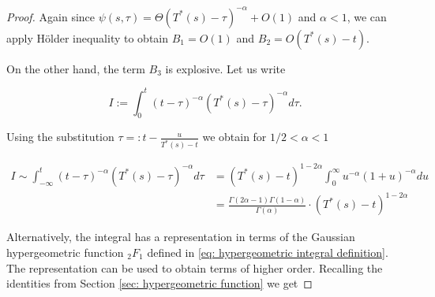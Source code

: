 \documentclass[12pt,twoside]{article}
\theoremstyle{plain}
\theoremstyle{plain}
\theoremstyle{definition}
\theoremstyle{remark}
\numberwithin{equation}{section}
\begin{document}
\begin{proof}
Again since $\psi(s,\tau) = \Theta(T^*(s)-\tau)^{-\alpha} + O(1)$ and $\alpha < 1$, we can apply Hölder inequality to obtain $B_1 = O(1)$ and $B_2 = O(T^*(s)-t)$.

On the other hand, the term $B_3$ is explosive. Let us write

$$I := \int_{0}^{t}(t-\tau)^{-\alpha}(T^*(s)-\tau)^{-\alpha} d \tau.$$

Using the substitution $\tau =: t - \frac{u}{T^*(s)-t}$ we obtain for $1/2 < \alpha < 1$

\begin{equation}
\label{eq: leading order term without hypergeometric function}
\begin{aligned}
I \sim \int_{-\infty}^{t}(t-\tau)^{-\alpha}(T^*(s)-\tau)^{-\alpha} d\tau
&=(T^*(s)-t)^{1-2 \alpha} \int_{0}^{\infty} u^{-\alpha}(1+u)^{-\alpha} du \\[10pt]
&= \frac{\Gamma(2\alpha - 1)\Gamma(1-\alpha)}{\Gamma(\alpha)} \cdot (T^*(s)-t)^{1-2 \alpha}
\end{aligned}
\end{equation}

Alternatively, the integral has a representation in terms of the Gaussian hypergeometric function $_2 F_1$ defined in \eqref{eq: hypergeometric integral definition}. The representation can be used to obtain terms of higher order. Recalling the identities from Section \ref{sec: hypergeometric function} we get

\newpage\clearpage


\end{proof}
\end{document}

